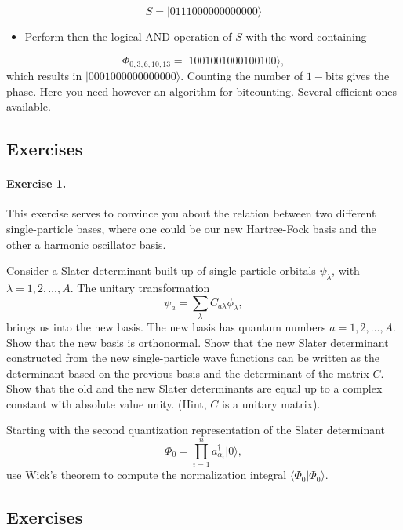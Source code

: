 \documentclass[%
twoside,                 %
final,                   %
10pt]{article}
\begin{document}
\noindent
\[
S=|0111000000000000\rangle
\]
\begin{itemize}
\item Perform then the logical AND operation of $S$ with the word containing 
\end{itemize}

\noindent
\[
\Phi_{0,3,6,10,13} = |1001001000100100\rangle,
\]
which results in $|0001000000000000\rangle$. Counting the number of $1-$bits gives the phase.  Here you need however an algorithm for bitcounting. Several efficient ones available.





\subsection*{Exercises}

\paragraph{Exercise 1.}
This exercise serves to convince you about the relation between
two different single-particle bases, where one could be our new Hartree-Fock basis and the other a harmonic oscillator basis.

Consider a Slater determinant built up of single-particle orbitals $\psi_{\lambda}$, 
with $\lambda = 1,2,\dots,A$. The unitary transformation
\[
\psi_a  = \sum_{\lambda} C_{a\lambda}\phi_{\lambda},
\]
brings us into the new basis.  
The new basis has quantum numbers $a=1,2,\dots,A$.
Show that the new basis is orthonormal.
Show that the new Slater determinant constructed from the new single-particle wave functions can be
written as the determinant based on the previous basis and the determinant of the matrix $C$.
Show that the old and the new Slater determinants are equal up to a complex constant with absolute value unity.
(Hint, $C$ is a unitary matrix). 

Starting with the second quantization representation of the Slater determinant 
\[
\Phi_{0}=\prod_{i=1}^{n}a_{\alpha_{i}}^{\dagger}|0\rangle,
\]
use Wick's theorem to compute the normalization integral
$\langle\Phi_{0}|\Phi_{0}\rangle$.



\subsection*{Exercises}
\end{document}
